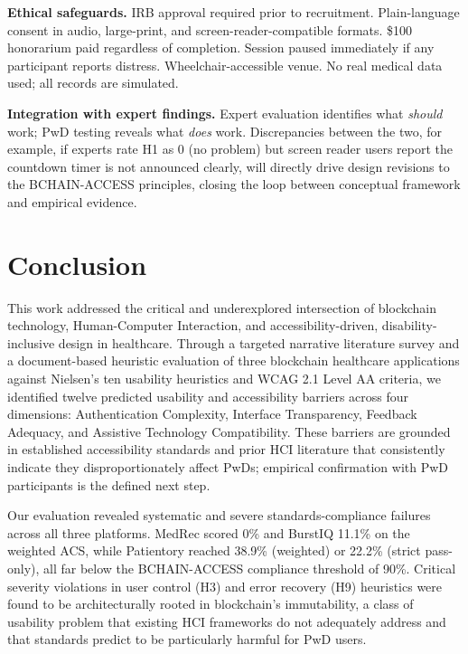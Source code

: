 \documentclass[journal,onecolumn]{IEEEtran}
\begin{document}
\textbf{Ethical safeguards.} IRB approval required prior to recruitment. Plain-language consent in audio, large-print, and screen-reader-compatible formats. \$100 honorarium paid regardless of completion. Session paused immediately if any participant reports distress. Wheelchair-accessible venue. No real medical data used; all records are simulated.

\textbf{Integration with expert findings.} Expert evaluation identifies what \emph{should} work; PwD testing reveals what \emph{does} work. Discrepancies between the two, for example, if experts rate H1 as 0 (no problem) but screen reader users report the countdown timer is not announced clearly, will directly drive design revisions to the BCHAIN-ACCESS principles, closing the loop between conceptual framework and empirical evidence.

\section{Conclusion}
\label{sec:conclusion}

This work addressed the critical and underexplored intersection of blockchain technology, Human-Computer Interaction, and accessibility-driven, disability-inclusive design in healthcare. Through a targeted narrative literature survey and a document-based heuristic evaluation of three blockchain healthcare applications against Nielsen's ten usability heuristics and WCAG 2.1 Level AA criteria, we identified twelve predicted usability and accessibility barriers across four dimensions: Authentication Complexity, Interface Transparency, Feedback Adequacy, and Assistive Technology Compatibility. These barriers are grounded in established accessibility standards and prior HCI literature that consistently indicate they disproportionately affect PwDs; empirical confirmation with PwD participants is the defined next step.

Our evaluation revealed systematic and severe standards-compliance failures across all three platforms. MedRec scored 0\% and BurstIQ 11.1\% on the weighted ACS, while Patientory reached 38.9\% (weighted) or 22.2\% (strict pass-only), all far below the BCHAIN-ACCESS compliance threshold of 90\%. Critical severity violations in user control (H3) and error recovery (H9) heuristics were found to be architecturally rooted in blockchain's immutability, a class of usability problem that existing HCI frameworks do not adequately address and that standards predict to be particularly harmful for PwD users.
\end{document}
